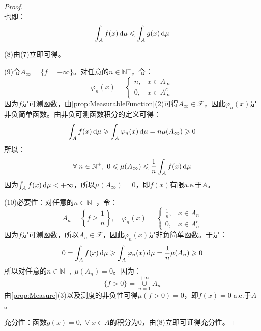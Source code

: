 \begin{proof}
\begin{equation*}
	\end{equation*}
	也即：
	\begin{equation*}
		\int_{A}f(x)\mathop{}\!\mathrm{d}\mu\leqslant\int_{A}g(x)\mathop{}\!\mathrm{d}\mu
	\end{equation*}\par
	(8)由(7)立即可得。\par
	(9)令$A_\infty=\{f=+\infty\}$。对任意的$n\in\mathbb{N}^+$，令：
	\begin{equation*}
		\varphi_n(x)=
		\begin{cases}
			n,&x\in A_\infty \\
			0,&x\in A_\infty^c
		\end{cases}
	\end{equation*}
	因为$f$是可测函数，由\cref{prop:MeasurableFunction}(2)可得$A_\infty\in\mathscr{F}$，因此$\varphi_n(x)$是非负简单函数。由非负可测函数积分的定义可得：
	\begin{equation*}
		\int_{A}f(x)\mathop{}\!\mathrm{d}\mu\geqslant\int_{A}\varphi_n(x)\mathop{}\!\mathrm{d}\mu=n\mu(A_\infty)\geqslant0
	\end{equation*}
	所以：
	\begin{equation*}
		\forall\;n\in\mathbb{N}^+,\;0\leqslant \mu(A_\infty)\leqslant\frac{1}{n}\int_{A}f(x)\mathop{}\!\mathrm{d}\mu
	\end{equation*}
	因为$\int_{A}f(x)\mathop{}\!\mathrm{d}\mu<+\infty$，所以$\mu(A_\infty)=0$，即$f(x)$有限a.e.于$A$。\par
	(10)必要性：对任意的$n\in\mathbb{N}^+$，令：
	\begin{equation*}
		A_n=\left\{f\geqslant\frac{1}{n}\right\},\quad
		\varphi_n(x)=
		\begin{cases}
			\frac{1}{n},&x\in A_n \\
			0,&x\in A_n^c
		\end{cases}
	\end{equation*}
	因为$f$是可测函数，所以$A_n\in \mathscr{F}$，因此$\varphi_n(x)$是非负简单函数。于是：
	\begin{equation*}
		0=\int_{A}f(x)\mathop{}\!\mathrm{d}\mu\geqslant\int_{A}\varphi_n(x)\mathop{}\!\mathrm{d}\mu=\frac{1}{n}\mu(A_n)\geqslant0
	\end{equation*}
	所以对任意的$n\in\mathbb{N}^+,\;\mu(A_n)=0$。因为：
	\begin{equation*}
		\{f>0\}=\underset{n=1}{\overset{+\infty}{\cup}}A_n
	\end{equation*}
	由\cref{prop:Measure}(3)以及测度的非负性可得$\mu(f>0)=0$，即$f(x)=0\;$a.e.于$A$。\par
	充分性：函数$g(x)=0,\;\forall\;x\in A$的积分为$0$，由(8)立即可证得充分性。
\end{proof}

